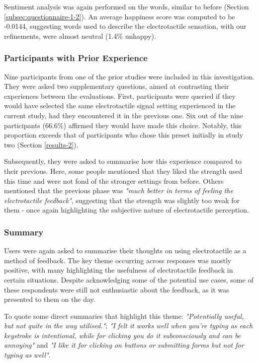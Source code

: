 \documentclass{mpaper}
\begin{document}
Sentiment analysis was again performed on the words, similar to before (Section \ref{subsec:questionnaire-1-2}). An average happiness score was computed to be -0.0144, suggesting words used to describe the electrotactile sensation, with our refinements, were almost neutral (1.4\% unhappy).

\subsubsection{Participants with Prior Experience}
Nine participants from one of the prior studies were included in this investigation. They were asked two supplementary questions, aimed at contrasting their experiences between the evaluations. First, participants were queried if they would have selected the same electrotactile signal setting experienced in the current study, had they encountered it in the previous one. Six out of the nine participants (66.6\%) affirmed they would have made this choice. Notably, this proportion exceeds that of participants who chose this preset initially in study two (Section \ref{results-2}).

Subsequently, they were asked to summarise how this experience compared to their previous. Here, some people mentioned that they liked the strength used this time and were not fond of the stronger settings from before. Others mentioned that the previous phase was \emph{"much better in terms of feeling the electrotactile feedback"}, suggesting that the strength was slightly too weak for them - once again highlighting the subjective nature of electrotactile perception.

\vfill\break
\subsubsection{Summary}
Users were again asked to summarise their thoughts on using electrotactile as a method of feedback. The key theme occurring across responses was mostly positive, with many highlighting the usefulness of electrotactile feedback in certain situations. Despite acknowledging some of the potential use cases, some of these respondents were still not enthusiastic about the feedback, as it was presented to them on the day.

To quote some direct summaries that highlight this theme: \emph{"Potentially useful, but not quite in the way utilised."}; \emph{"I felt it works well when you're typing as each keystroke is intentional, while for clicking you do it subconsciously and can be annoying"} and \emph{"I like it for clicking on buttons or submitting forms but not for typing as well"}.
\end{document}
